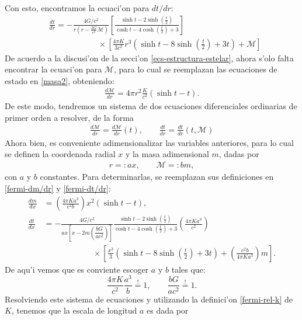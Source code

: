 Con esto, encontramos la ecuaci'on para $dt/dr$:
\begin{align}
&\frac{dt}{dr}=-\frac{4G/c^2}{r\left(r-\frac{2G}{c^2}\mathcal{M}\right)}\left[\frac{\sinh t-2\sinh\left(\frac{t}{2}\right)}{\cosh t-4\cosh \left(\frac{t}{2}\right)+3}\right] \nonumber\\
& \qquad\qquad\qquad  \times \left[\frac{4\pi K}{3c^2} r^3\left(\sinh t-8\sinh \left(\frac{t}{2}\right)+3t\right)+\mathcal{M}\right]\label{fermi-dt/dr}
\end{align}
De acuerdo a la discusi'on de la secci'on \eqref{ecs-estructura-estelar}, ahora s'olo falta encontrar la ecuaci'on para $\mathcal{M}$, para lo cual se reemplazan las ecuaciones de estado en \eqref{masa2}, obteniendo:
\begin{align}
\frac{d\mathcal{M}}{dr}=4\pi r^2\frac{K}{c^2}(\sinh t-t)\label{fermi-dm/dr}.
\end{align}
De este modo, tendremos un sistema de dos ecuaciones diferenciales ordinarias de primer orden a resolver, de la forma
\begin{align}
 \frac{d\mathcal{M}}{dr}=\frac{d\mathcal{M}}{dr}(t),\qquad\frac{dt}{dr}=\frac{dt}{dr}(t,\mathcal{M})
\end{align}
Ahora bien, es conveniente adimensionalizar las variables anteriores, para lo cual se definen la coordenada radial $x$ y la masa adimensional $m$, dadas por
\begin{align}
 r=:ax,\qquad \mathcal{M}=:bm,
\end{align}
con $a$ y $b$ constantes. Para determinarlas, se reemplazan sus definiciones en \eqref{fermi-dm/dr} y \eqref{fermi-dt/dr}:
\begin{align}
 \frac{dm}{dx}&=\left(\frac{4\pi Ka^3}{c^2b}\right)x^2\left(\sinh t-t\right),\\
\frac{dt}{dx}&=-\frac{4G/c^2}{ax\left[x-2m\left(\dfrac{bG}{ac^2}\right)\right]}\frac{\sinh t-2\sinh\left(\frac{t}{2}\right)}{\cosh t-4\cosh \left(\frac{t}{2}\right)+3}\left(\frac{4\pi K a^3}{c^2}\right)\nonumber\\
&\qquad\qquad\qquad\times\left[ \frac{x^3}{3}\left(\sinh t-8\sinh \left(\frac{t}{2}\right)+3t\right)+\left(\frac{c^2b}{4\pi K a^3}\right)m\right].
\end{align}
De aqu'i vemos que es conviente escoger $a$ y $b$ tales que:
\begin{equation}\label{fermi-rel-sust-ayb}
\frac{4\pi K}{c^2}\frac{a^3}{b}\stackrel{!}{=}1,\qquad  \frac{bG}{ac^2}\stackrel{!}{=}1.
\end{equation}
Resolviendo este sistema de ecuaciones y utilizando la definici'on \eqref{fermi-rel-k} de $K$, tenemos que la escala de longitud $a$ es dada por
